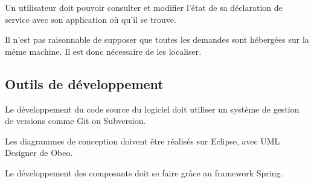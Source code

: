 \begin{requirement}
	Un utilisateur doit pouvoir consulter et modifier l’état de sa déclaration de service avec son application où qu’il se trouve.
\end{requirement}

\begin{requirement}
Il n’est pas raisonnable de supposer que toutes les demandes sont hébergées sur la même machine. Il est donc nécessaire de les localiser.
\end{requirement}

\subsection{Outils de développement}

\begin{requirement}
	Le développement du code source du logiciel doit utiliser un système de gestion de versions comme Git ou Subversion.
\end{requirement}

\begin{requirement}
	Les diagrammes de conception doivent être réalisés sur Eclipse, avec UML Designer de Obeo.
\end{requirement}

\begin{requirement}[Spring]
	Le développement des composants doit se faire grâce au framework Spring.
\end{requirement}

\renewcommand{\listtheoremname}{Liste des exigences}

\listoftheorems[ignoreall,show={requirement}]

